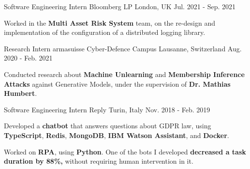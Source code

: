 

\begin{cventries}

  \cventry
  {Software Engineering Intern} %
  {Bloomberg LP} %
  {London, UK} %
  {Jul. 2021 - Sep. 2021} %
  {
    \begin{cvitems} %
      \item Worked in the \textbf{Multi Asset Risk System} team, on the re-design and implementation of the configuration of a distributed logging library.
    \end{cvitems}
  }

  \cventry
  {Research Intern} %
  {armasuisse Cyber-Defence Campus} %
  {Lausanne, Switzerland} %
  {Aug. 2020 - Feb. 2021} %
  {
    \begin{cvitems} %
      \item Conducted research about \textbf{Machine Unlearning} and \textbf{Membership Inference Attacks} against Generative Models, under the supervision of \textbf{Dr. Mathias Humbert}.
    \end{cvitems}
  }

  \cventry
  {Software Engineering Intern} %
  {Reply} %
  {Turin, Italy} %
  {Nov. 2018 - Feb. 2019} %
  {
    \begin{cvitems} %
      \item Developed a \textbf{chatbot} that answers questions about GDPR law, using \textbf{TypeScript}, \textbf{Redis}, \textbf{MongoDB}, \textbf{IBM Watson Assistant}, and \textbf{Docker}.
      \item Worked on \textbf{RPA}, using \textbf{Python}. One of the bots I developed \textbf{decreased a task duration by 88\%,} without requiring human intervention in it.
    \end{cvitems}
  }

\end{cventries}

